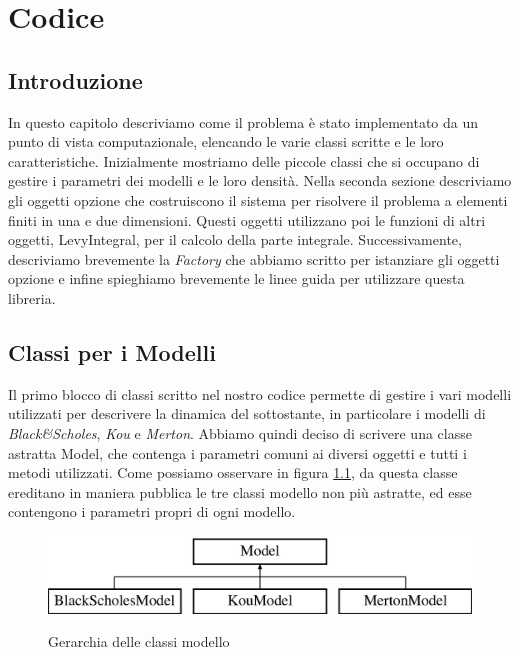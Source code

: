 \documentclass[a4paper,10pt]{report}
\theoremstyle{plain}
\theoremstyle{definition}
\theoremstyle{remark}
\begin{document}
\chapter{Codice}
\section{Introduzione}
In questo capitolo descriviamo come il problema \`e stato implementato da un punto di vista computazionale, elencando le varie classi scritte e le loro caratteristiche. Inizialmente mostriamo delle piccole classi che si occupano di gestire i parametri dei modelli e le loro densit\`a. Nella seconda sezione descriviamo gli oggetti opzione che costruiscono il sistema per risolvere il problema a elementi finiti in una e due dimensioni. Questi oggetti utilizzano poi le funzioni di altri oggetti, \textsf{LevyIntegral}, per il calcolo della parte integrale. Successivamente, descriviamo brevemente la \emph{Factory} che abbiamo scritto per istanziare gli oggetti opzione e infine spieghiamo brevemente le linee guida per utilizzare questa libreria.
\section{Classi per i Modelli}
Il primo blocco di classi scritto nel nostro codice permette di gestire i vari modelli utilizzati per descrivere la dinamica del sottostante, in particolare i modelli di \emph{Black\&Scholes}, \emph{Kou} e \emph{Merton}. Abbiamo quindi deciso di scrivere una classe astratta \textsf{Model}, che contenga i parametri comuni ai diversi oggetti e tutti i metodi utilizzati. Come possiamo osservare in figura \ref{modelbase}, da questa classe ereditano in maniera pubblica le tre classi modello non pi\`u astratte, ed esse contengono i parametri propri di ogni modello.
\begin{figure}[h!]
\begin{center}
\includegraphics[width=12cm]{img/classModel.eps}
\label{modelbase}
\caption{Gerarchia delle classi modello}
\end{center}
\end{figure}
\end{document}
